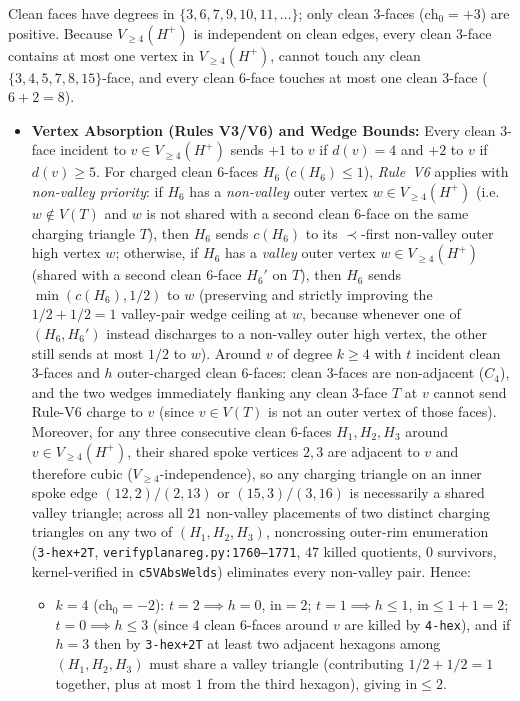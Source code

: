 \documentclass[11pt,reqno]{amsart}
\theoremstyle{plain}
\theoremstyle{definition}
\theoremstyle{remark}
\newcommand{\chz}{\mathrm{ch}_0}
\newcommand{\Vge}{V_{\ge 4}}
\DeclareRobustCommand{\_}{\ifmmode\text{\textunderscore}\else\textunderscore\allowbreak\fi}
\begin{document}
Clean faces have degrees in $\{3, 6, 7, 9, 10, 11, \dots\}$; only clean $3$-faces ($\chz = +3$) are positive. Because $\Vge(H^+)$ is independent on clean edges, every clean $3$-face contains at most one vertex in $\Vge(H^+)$, cannot touch any clean $\{3, 4, 5, 7, 8, 15\}$-face, and every clean $6$-face touches at most one clean $3$-face ($6+2=8$).

\begin{itemize}[leftmargin=1.8em]
  \item \textbf{Vertex Absorption (Rules V3/V6) and Wedge Bounds:} Every clean $3$-face incident to $v \in \Vge(H^+)$ sends $+1$ to $v$ if $d(v) = 4$ and $+2$ to $v$ if $d(v) \ge 5$. For charged clean $6$-faces $H_6$ ($c(H_6) \le 1$), \emph{Rule~V6} applies with \emph{non-valley priority}: if $H_6$ has a \emph{non-valley} outer vertex $w \in \Vge(H^+)$ (i.e.\ $w \notin V(T)$ and $w$ is not shared with a second clean $6$-face on the same charging triangle $T$), then $H_6$ sends $c(H_6)$ to its $\prec$-first non-valley outer high vertex $w$; otherwise, if $H_6$ has a \emph{valley} outer vertex $w \in \Vge(H^+)$ (shared with a second clean $6$-face $H_6'$ on $T$), then $H_6$ sends $\min(c(H_6), 1/2)$ to $w$ (preserving and strictly improving the $1/2 + 1/2 = 1$ valley-pair wedge ceiling at $w$, because whenever one of $(H_6, H_6')$ instead discharges to a non-valley outer high vertex, the other still sends at most $1/2$ to $w$). Around $v$ of degree $k \ge 4$ with $t$ incident clean $3$-faces and $h$ outer-charged clean $6$-faces: clean $3$-faces are non-adjacent ($C_4$), and the two wedges immediately flanking any clean $3$-face $T$ at $v$ cannot send Rule-V6 charge to $v$ (since $v \in V(T)$ is not an outer vertex of those faces). Moreover, for any three consecutive clean $6$-faces $H_1, H_2, H_3$ around $v \in \Vge(H^+)$, their shared spoke vertices $2, 3$ are adjacent to $v$ and therefore cubic ($\Vge$-independence), so any charging triangle on an inner spoke edge $(12, 2)/(2, 13)$ or $(15, 3)/(3, 16)$ is necessarily a shared valley triangle; across all $21$ non-valley placements of two distinct charging triangles on any two of $(H_1, H_2, H_3)$, noncrossing outer-rim enumeration (\texttt{3-hex+2T}, \texttt{verify\_planar\_eg.py:1760--1771}, $47$ killed quotients, $0$ survivors, kernel-verified in \texttt{c5VAbsWelds}) eliminates every non-valley pair. Hence:
  \begin{itemize}[leftmargin=1.5em]
    \item $k = 4$ ($\chz = -2$): $t = 2 \implies h = 0$, $\mathrm{in} = 2$; $t = 1 \implies h \le 1$, $\mathrm{in} \le 1 + 1 = 2$; $t = 0 \implies h \le 3$ (since $4$ clean $6$-faces around $v$ are killed by \texttt{4-hex}), and if $h = 3$ then by \texttt{3-hex+2T} at least two adjacent hexagons among $(H_1, H_2, H_3)$ must share a valley triangle (contributing $1/2 + 1/2 = 1$ together, plus at most $1$ from the third hexagon), giving $\mathrm{in} \le 2$.

\end{itemize}
\end{itemize}
\end{document}
